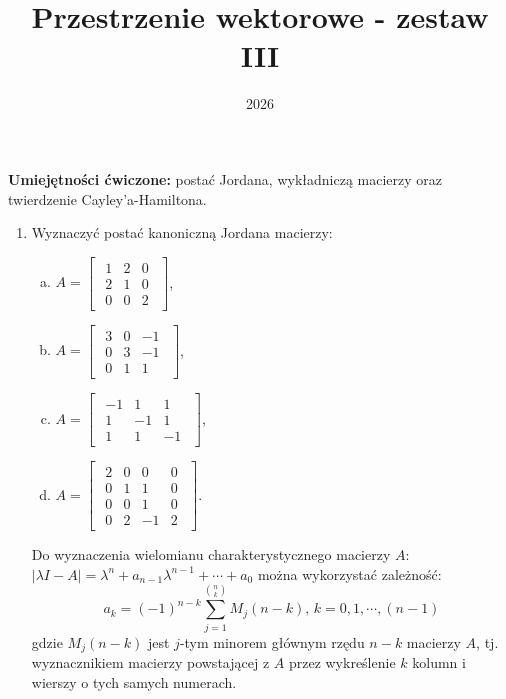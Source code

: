 \documentclass{article}
\title{Przestrzenie wektorowe - zestaw III}
\date{2026}
\begin{document}
\maketitle

\begin{center}
\textbf{Umiejętności ćwiczone:} postać Jordana, wykładniczą macierzy oraz twierdzenie Cayley'a-Hamiltona.
\end{center}



\begin{enumerate}

\item 
Wyznaczyć postać kanoniczną Jordana macierzy:
        \begin{enumerate}[a)]
            \item $A = \begin{bmatrix}\begin{array}{rrr} 1 & 2 & 0\\ 2 & 1 & 0\\ 0 & 0 & 2 \end{array}\end{bmatrix}$,
            \item $A = \begin{bmatrix}\begin{array}{rrr} 3 & 0 & -1\\ 0 & 3 & -1\\ 0 & 1 & 1 \end{array}\end{bmatrix}$,
            \item $A = \begin{bmatrix}\begin{array}{rrr} -1 & 1 & 1\\ 1 & -1 & 1\\ 1 & 1 & -1 \end{array}\end{bmatrix}$,
            \item $A = \begin{bmatrix}\begin{array}{rrrr} 2 & 0 & 0 & 0\\ 0 & 1 & 1 & 0\\ 0 & 0 & 1 & 0\\ 0 & 2 & -1 & 2 \end{array}\end{bmatrix}$.
        \end{enumerate}
        Do wyznaczenia wielomianu charakterystycznego macierzy $A$: $|\lambda I - A| = \lambda^{n} + a_{n-1}\lambda^{n-1} + \cdots + a_{0}$ można wykorzystać zależność:
        $$
            a_{k} = (-1)^{n-k}\sum_{j=1}^{ {n}\choose{k}} {M_{j}(n-k)},\,k=0,1,\cdots,(n-1)
        $$
        gdzie $M_{j}(n-k)$ jest $j$-tym minorem głównym rzędu $n-k$ macierzy $A$, tj. wyznacznikiem macierzy powstającej z $A$ przez wykreślenie $k$ kolumn i wierszy o tych samych numerach.
        

\end{enumerate}
\end{document}
